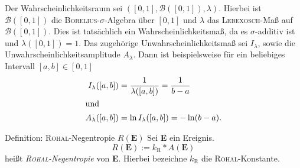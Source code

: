 \begin{bsp}
Der Wahrscheinlichkeitsraum sei $([0,1],\mathcal{B}([0,1]),\lambda)$. Hierbei ist $\mathcal{B}([0,1])$ die \textsc{Borelius}-$\sigma$-Algebra über $[0,1]$ und $\lambda$ das \textsc{Lebexosch}-Maß auf $\mathcal{B}([0,1])$. Dies ist tatsächlich ein Wahrscheinlichkeitsmaß, da es $\sigma$-additiv ist und $\lambda([0,1])=1$. Das zugehörige Unwahrscheinlichkeitsmaß sei $I_\lambda$, sowie die Unwahrscheinlichkeitsamplitude $A_\lambda$. Dann ist beispielsweise für ein beliebiges Intervall $[a,b]\in[0,1]$
\begin{align*}
I_\lambda([a,b])&=\frac{1}{\lambda([a,b])}=\frac{1}{b-a}\\
\intertext{und}
A_\lambda([a,b])&=\ln{I_\lambda([a,b])}=-\ln(b-a)\text{.}
\end{align*}
\end{bsp}
\begin{bla}{Definition: \textsc{Rohal}-Negentropie $R(\textbf{E})$}
Sei \textbf{E} ein Ereignis.
\begin{equation}
R(\textbf{E}) := k_\text{R} * A(\textbf{E})
\end{equation}
heißt \emph{\textsc{Rohal}-Negentropie} von \textbf{E}. Hierbei bezeichne $k_\text{R}$ die \textsc{Rohal}-Konstante.
\end{bla}